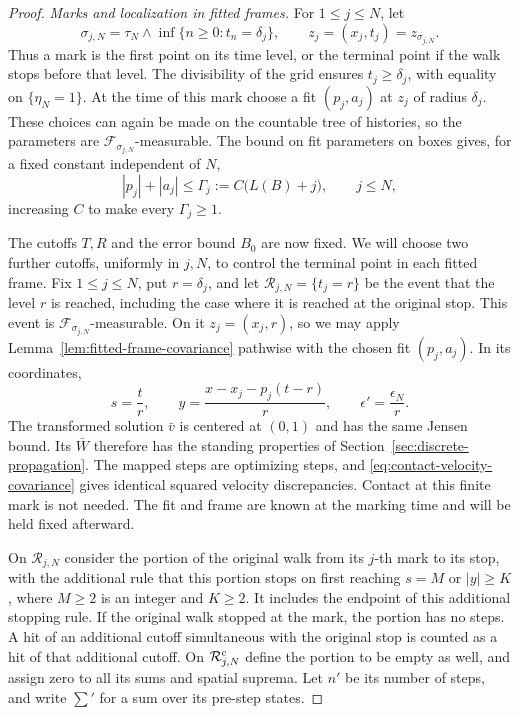\documentclass[11pt]{article}
\numberwithin{equation}{section}
\theoremstyle{definition}
\theoremstyle{remark}
\begin{document}
\begin{proof}
\medskip\noindent\emph{Marks and localization in fitted frames.}
For $1\le j\le N$, let
\[
  \sigma_{j,N}=\tau_N\wedge\inf\{n\ge0:t_n=\delta_j\},\qquad
  z_j=(x_j,t_j)=z_{\sigma_{j,N}}.
\]
Thus a mark is the first point on its time level, or the terminal point if
the walk stops before that level.  The divisibility of the grid ensures
$t_j\ge\delta_j$, with equality on $\{\eta_N=1\}$.  At the time of this
mark choose a fit $(p_j,a_j)$ at $z_j$ of radius $\delta_j$.  These choices
can again be made on the countable tree of histories, so the parameters are
$\mathcal F_{\sigma_{j,N}}$-measurable.  The bound on fit parameters on boxes
gives, for a fixed constant independent of $N$,
\[
  |p_j|+|a_j|\le\Gamma_j:=C\bigl(L(B)+j\bigr),\qquad j\le N,
\]
increasing $C$ to make every $\Gamma_j\ge1$.

The cutoffs $T,R$ and the error bound $B_0$ are now fixed.  We will choose
two further cutoffs, uniformly in $j,N$, to control the terminal point in
each fitted frame.  Fix $1\le j\le N$, put $r=\delta_j$, and let
$\mathcal R_{j,N}=\{t_j=r\}$ be the event that the level $r$ is reached,
including the case where it is reached at the original stop.  This event is
$\mathcal F_{\sigma_{j,N}}$-measurable.  On it $z_j=(x_j,r)$, so we may apply
Lemma~\ref{lem:fitted-frame-covariance} pathwise with the chosen fit
$(p_j,a_j)$.  In its coordinates,
\[
  s=\frac{t}{r},\qquad
  y=\frac{x-x_j-p_j(t-r)}{r},\qquad
  \epsilon'=\frac{\epsilon_N}{r}.
\]
The transformed solution $\bar v$ is centered at $(0,1)$ and has the same
Jensen bound.  Its $\bar W$ therefore has the standing properties of
Section~\ref{sec:discrete-propagation}.  The mapped steps are optimizing
steps, and \eqref{eq:contact-velocity-covariance} gives identical squared
velocity discrepancies.  Contact at this finite mark is not needed.  The
fit and frame are known at the marking time and will be held fixed afterward.

On $\mathcal R_{j,N}$ consider the portion of the original walk from its
$j$-th mark to its stop, with the additional rule that this portion stops
on first reaching $s=M$ or $|y|\ge K$, where $M\ge2$ is an integer and
$K\ge2$.  It includes the endpoint of this additional stopping rule.  If
the original walk stopped at the mark, the portion has no steps.  A hit of
an additional cutoff simultaneous with the original stop is counted as a
hit of that additional cutoff.  On $\mathcal R_{j,N}^{\rm c}$ define the
portion to be empty as well, and assign zero to all its sums and spatial
suprema.  Let $n'$ be its number of steps, and write $\sum'$ for a sum over
its pre-step states.


\end{proof}
\end{document}

